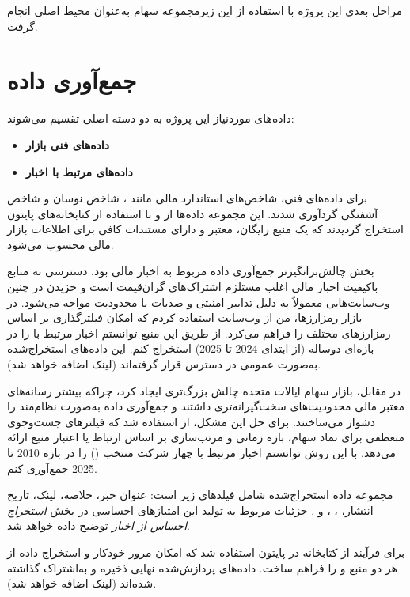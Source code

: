 \documentclass[12pt, a4paper]{report}
\begin{document}
مراحل بعدی این پروژه با استفاده از این زیرمجموعه سهام به‌عنوان محیط اصلی انجام گرفت.  


\section{جمع‌آوری داده}

داده‌های موردنیاز این پروژه به دو دسته اصلی تقسیم می‌شوند:
\begin{itemize}
    \item \textbf{داده‌های فنی بازار}  
    \item \textbf{داده‌های مرتبط با اخبار}
\end{itemize}

برای داده‌های فنی، شاخص‌های استاندارد مالی مانند ، شاخص نوسان  و شاخص آشفتگی  گردآوری شدند. این مجموعه داده‌ها از  و با استفاده از کتابخانه‌های پایتون استخراج گردیدند که یک منبع رایگان، معتبر و دارای مستندات کافی برای اطلاعات بازار مالی محسوب می‌شود.  

بخش چالش‌برانگیزتر جمع‌آوری داده مربوط به اخبار مالی بود. دسترسی به منابع باکیفیت اخبار مالی اغلب مستلزم اشتراک‌های گران‌قیمت است و خزیدن در چنین وب‌سایت‌هایی معمولاً به دلیل تدابیر امنیتی و ضدبات با محدودیت مواجه می‌شود. در بازار رمزارزها، من از وب‌سایت  استفاده کردم که امکان فیلترگذاری بر اساس رمزارزهای مختلف را فراهم می‌کرد. از طریق این منبع توانستم اخبار مرتبط با  را در بازه‌ای دوساله (از ابتدای 2024 تا 2025) استخراج کنم. این داده‌های استخراج‌شده به‌صورت عمومی در دسترس قرار گرفته‌اند (لینک اضافه خواهد شد).  

در مقابل، بازار سهام ایالات متحده چالش بزرگ‌تری ایجاد کرد، چراکه بیشتر رسانه‌های معتبر مالی محدودیت‌های سخت‌گیرانه‌تری داشتند و جمع‌آوری داده به‌صورت نظام‌مند را دشوار می‌ساختند. برای حل این مشکل، از  استفاده شد که فیلترهای جست‌وجوی منعطفی برای نماد سهام، بازه زمانی و مرتب‌سازی بر اساس ارتباط یا اعتبار منبع ارائه می‌دهد. با این روش توانستم اخبار مرتبط با چهار شرکت منتخب () را در بازه 2010 تا 2025 جمع‌آوری کنم.  

مجموعه داده استخراج‌شده شامل فیلدهای زیر است: عنوان خبر، خلاصه، لینک، تاریخ انتشار، ، ،  و . جزئیات مربوط به تولید این امتیازهای احساسی در بخش \textit{استخراج احساس از اخبار} توضیح داده خواهد شد.  

برای فرآیند  از کتابخانه  در پایتون استفاده شد که امکان مرور خودکار و استخراج داده از هر دو منبع  و  را فراهم ساخت. داده‌های پردازش‌شده نهایی ذخیره و به‌اشتراک گذاشته شده‌اند (لینک اضافه خواهد شد).  
\end{document}
